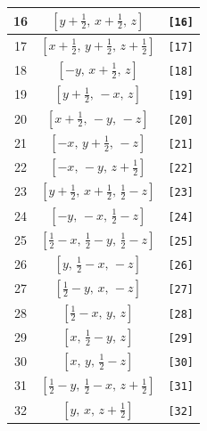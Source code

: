 \documentclass[fleqn,8pt]{jsarticle}
\begin{document}
\begin{longtable}{ccc}
16 & $\left[ y + \frac{1}{2},\, x + \frac{1}{2},\, z \right]$ & {\tt [16]} \\ \hline
17 & $\left[ x + \frac{1}{2},\, y + \frac{1}{2},\, z + \frac{1}{2} \right]$ & {\tt [17]} \\ \hline
18 & $\left[ - y,\, x + \frac{1}{2},\, z \right]$ & {\tt [18]} \\ \hline
19 & $\left[ y + \frac{1}{2},\, - x,\, z \right]$ & {\tt [19]} \\ \hline
20 & $\left[ x + \frac{1}{2},\, - y,\, - z \right]$ & {\tt [20]} \\ \hline
21 & $\left[ - x,\, y + \frac{1}{2},\, - z \right]$ & {\tt [21]} \\ \hline
22 & $\left[ - x,\, - y,\, z + \frac{1}{2} \right]$ & {\tt [22]} \\ \hline
23 & $\left[ y + \frac{1}{2},\, x + \frac{1}{2},\, \frac{1}{2} - z \right]$ & {\tt [23]} \\ \hline
24 & $\left[ - y,\, - x,\, \frac{1}{2} - z \right]$ & {\tt [24]} \\ \hline
25 & $\left[ \frac{1}{2} - x,\, \frac{1}{2} - y,\, \frac{1}{2} - z \right]$ & {\tt [25]} \\ \hline
26 & $\left[ y,\, \frac{1}{2} - x,\, - z \right]$ & {\tt [26]} \\ \hline
27 & $\left[ \frac{1}{2} - y,\, x,\, - z \right]$ & {\tt [27]} \\ \hline
28 & $\left[ \frac{1}{2} - x,\, y,\, z \right]$ & {\tt [28]} \\ \hline
29 & $\left[ x,\, \frac{1}{2} - y,\, z \right]$ & {\tt [29]} \\ \hline
30 & $\left[ x,\, y,\, \frac{1}{2} - z \right]$ & {\tt [30]} \\ \hline
31 & $\left[ \frac{1}{2} - y,\, \frac{1}{2} - x,\, z + \frac{1}{2} \right]$ & {\tt [31]} \\ \hline
32 & $\left[ y,\, x,\, z + \frac{1}{2} \right]$ & {\tt [32]} \\
\end{longtable}
\end{document}
